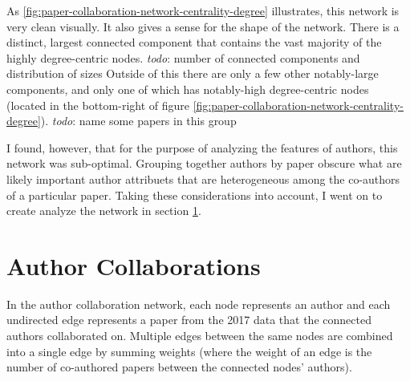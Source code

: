 \documentclass{article}
\newcommand{\todo}[1]{\textit{todo}: #1}
\begin{document}
As \ref{fig:paper-collaboration-network-centrality-degree} illustrates, this network is very clean visually.
It also gives a sense for the shape of the network.
There is a distinct, largest connected component that contains the vast majority of the highly degree-centric nodes.
\todo{number of connected components and distribution of sizes}
Outside of this there are only a few other notably-large components, and only one of which has notably-high degree-centric nodes (located in the bottom-right of figure \ref{fig:paper-collaboration-network-centrality-degree}).
\todo{name some papers in this group}

I found, however, that for the purpose of analyzing the features of authors, this network was sub-optimal.
Grouping together authors by paper obscure what are likely important author attribuets that are heterogeneous among the co-authors of a particular paper. Taking these considerations into account, I went on to create analyze the network in section \ref{sec:author-collaboration}.

\section{Author Collaborations}
\label{sec:author-collaboration}

In the author collaboration network, each node represents an author and each undirected edge represents a paper from the 2017 data that the connected authors collaborated on.
Multiple edges between the same nodes are combined into a single edge by summing weights (where the weight of an edge is the number of co-authored papers between the connected nodes' authors).
\end{document}
